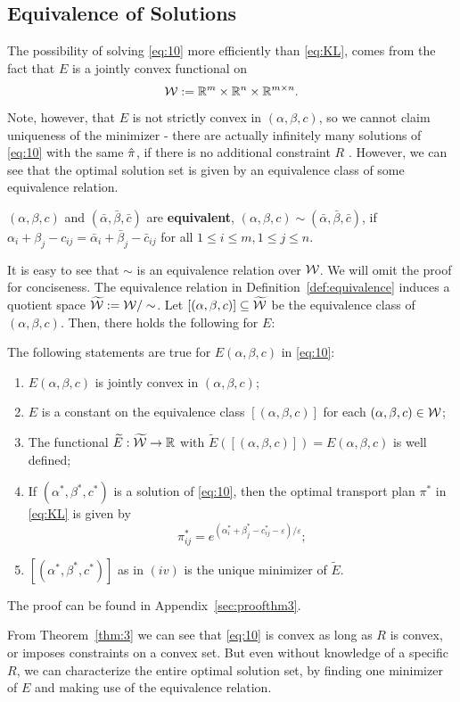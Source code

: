 \subsection{Equivalence of Solutions}
The possibility of solving \eqref{eq:10} more efficiently than \eqref{eq:KL}, comes from the fact that $E$ is a jointly convex functional on 
\[\mathcal{W} := \mathbb{R}^m \times \mathbb{R}^n \times \mathbb{R}^{m \times n}.\]
Note, however, that $E$ is not strictly convex in $(\alpha, \beta, c)$, so we cannot claim uniqueness of the minimizer - there are actually infinitely many solutions of \eqref{eq:10} with the same $\hat{\pi}$, if there is no additional constraint $R$ \citep{ma2021}. However, we can see that the optimal solution set is given by an equivalence class of some equivalence relation. \par 
\vspace{0.3cm}
\begin{definition}
	$(\alpha, \beta, c)$ and $(\bar{\alpha}, \bar{\beta}, \bar{c})$ are \textbf{equivalent}, $(\alpha, \beta, c) \sim (\bar{\alpha}, \bar{\beta}, \bar{c})$, if $\alpha_i + \beta_j - c_{ij} = \bar{\alpha}_i+ \bar{\beta}_j - \bar{c}_{ij}$ for all $1 \leq i \leq m, 1 \leq j \leq n$. 
	\label{def:equivalence}
\end{definition}
It is easy to see that $\sim$ is an equivalence relation over $\mathcal{W}$. We will omit the proof for conciseness. The equivalence relation in Definition~\ref{def:equivalence} induces a quotient space $\widetilde{\mathcal{W}} := \mathcal{W} /\sim$. Let $[(\alpha, \beta, c)] \subseteq \widetilde{\mathcal{W}}$ be the equivalence class of $(\alpha, \beta, c)$. Then, there holds the following for $E$: 
\vspace{0.3cm}
\begin{theorem}
	The following statements are true for $E(\alpha, \beta, c)$ in \eqref{eq:10}:
	\begin{enumerate}[label=(\roman*)]
		\item $E(\alpha, \beta, c)$ is jointly convex in $(\alpha, \beta, c)$;
		\item $E$ is a constant on the equivalence class $[(\alpha, \beta, c)]$ for each $(\alpha, \beta, c) \in \mathcal{W}$; 
		\item The functional $\widetilde{E}: \widetilde{\mathcal{W}} \rightarrow \mathbb{R}$ with $\widetilde{E}([(\alpha, \beta, c)]) = E(\alpha, \beta, c)$ is well defined;
		\item If $(\alpha^*, \beta^*, c^*)$ is a solution of \eqref{eq:10}, then the optimal transport plan $\pi^*$ in \eqref{eq:KL} is given by 
		\[\pi^*_{ij} = e^{(\alpha^*_i + \beta^*_j - c^*_{ij}-\varepsilon)/\varepsilon};\]
		\item $[(\alpha^*, \beta^*, c^*)]$ as in $(iv)$ is the unique minimizer of $\widetilde{E}$. 
	\end{enumerate}
	\label{thm:3}
\end{theorem}
The proof can be found in Appendix~\ref{sec:proofthm3}. \par 
From Theorem~\ref{thm:3} we can see that \eqref{eq:10} is convex as long as $R$ is convex, or imposes constraints on a convex set. But even without knowledge of a specific $R$, we can characterize the entire optimal solution set, by finding one minimizer of $E$ and making use of the equivalence relation. 

